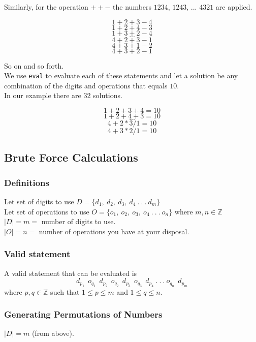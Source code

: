 \documentclass[12pt,a4paper]{article}
\begin{document}
Similarly, for the operation $+ + -$ the numbers $1234$, $1243$, ... $4321$ are applied.

\begin{framed}
\noindent 
$$1+2+3-4$$
$$1+2+4-3$$
$$1+3+2-4$$
$$...$$
$$4+2+3-1$$
$$4+3+1-2$$
$$4+3+2-1$$
\end{framed}

So on and so forth.\\

We use \texttt{eval} to evaluate each of these statements and let a solution be any combination of the digits and operations that equals $10$.\\

In our example there are 32 solutions.

\begin{framed}
$$1+2+3+4 = 10$$
$$1+2+4+3 = 10$$
$$...$$
$$4+2*3/1 = 10$$
$$4+3*2/1 = 10$$
\end{framed}

\subsection*{Brute Force Calculations}

\subsubsection*{Definitions}
Let set of digits to use $D = \lbrace d_1,~d_2,~d_3,~d_4~.~.~.~d_m \rbrace$\\
Let set of operations to use $O = \lbrace o_1,~o_2,~o_3,~o_4~.~.~.~o_n \rbrace$ where $m,n \in \mathbb{Z}$\\

\noindent $|D| = m = $ number of digits to use.\\
$|O| = n = $ number of operations you have at your disposal.

\subsubsection*{Valid statement}
\noindent A valid statement that can be evaluated is $$d_{p_{1}}~~o_{q_{1}}~~d_{p_{2}}~~o_{q_{2}}~~d_{p_{3}}~~o_{q_{3}}~~d_{p_{4}}~.~.~.~o_{q_{n}}~~d_{p_{m}}$$ where $p,q \in \mathbb{Z}$ such that $1 \leq p \leq m$ and $1 \leq q \leq n$.\\

\subsubsection*{Generating Permutations of Numbers}
\noindent $|D| = m$ (from above).\\
\end{document}
